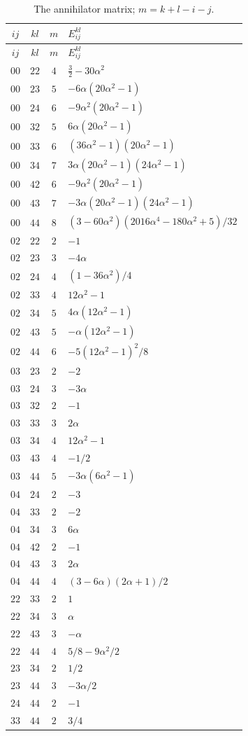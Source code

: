 \begingroup\small\renewcommand{\arraystretch}{1.13}
\begin{longtable}{@{}cccl@{}}
\caption{The annihilator matrix; $m=k+l-i-j$.}
\label{cyquant:tab:wfour}\\
\toprule $ij$&$kl$&$m$&$E_{ij}^{kl}$\\\midrule\endfirsthead
\toprule $ij$&$kl$&$m$&$E_{ij}^{kl}$\\\midrule\endhead
\bottomrule\endfoot
$00$&$22$&$4$&$\frac32-30\alpha^2$\\
$00$&$23$&$5$&$-6\alpha(20\alpha^2-1)$\\
$00$&$24$&$6$&$-9\alpha^2(20\alpha^2-1)$\\
$00$&$32$&$5$&$6\alpha(20\alpha^2-1)$\\
$00$&$33$&$6$&$(36\alpha^2-1)(20\alpha^2-1)$\\
$00$&$34$&$7$&$3\alpha(20\alpha^2-1)(24\alpha^2-1)$\\
$00$&$42$&$6$&$-9\alpha^2(20\alpha^2-1)$\\
$00$&$43$&$7$&$-3\alpha(20\alpha^2-1)(24\alpha^2-1)$\\
$00$&$44$&$8$&$(3-60\alpha^2)(2016\alpha^4-180\alpha^2+5)/32$\\
$02$&$22$&$2$&$-1$\\
$02$&$23$&$3$&$-4\alpha$\\
$02$&$24$&$4$&$(1-36\alpha^2)/4$\\
$02$&$33$&$4$&$12\alpha^2-1$\\
$02$&$34$&$5$&$4\alpha(12\alpha^2-1)$\\
$02$&$43$&$5$&$-\alpha(12\alpha^2-1)$\\
$02$&$44$&$6$&$-5(12\alpha^2-1)^2/8$\\
$03$&$23$&$2$&$-2$\\
$03$&$24$&$3$&$-3\alpha$\\
$03$&$32$&$2$&$-1$\\
$03$&$33$&$3$&$2\alpha$\\
$03$&$34$&$4$&$12\alpha^2-1$\\
$03$&$43$&$4$&$-1/2$\\
$03$&$44$&$5$&$-3\alpha(6\alpha^2-1)$\\
$04$&$24$&$2$&$-3$\\
$04$&$33$&$2$&$-2$\\
$04$&$34$&$3$&$6\alpha$\\
$04$&$42$&$2$&$-1$\\
$04$&$43$&$3$&$2\alpha$\\
$04$&$44$&$4$&$(3-6\alpha)(2\alpha+1)/2$\\
$22$&$33$&$2$&$1$\\
$22$&$34$&$3$&$\alpha$\\
$22$&$43$&$3$&$-\alpha$\\
$22$&$44$&$4$&$5/8-9\alpha^2/2$\\
$23$&$34$&$2$&$1/2$\\
$23$&$44$&$3$&$-3\alpha/2$\\
$24$&$44$&$2$&$-1$\\
$33$&$44$&$2$&$3/4$\\
\end{longtable}
\endgroup

